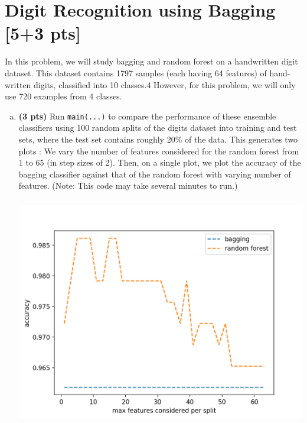 \documentclass[11pt]{article}
\begin{document}
\begin{enumerate}[(a)]
\begin{enumerate}[i.]
\end{enumerate}

\end{enumerate}

\section{Digit Recognition using Bagging [5+3 pts]}

In this problem, we will study bagging and random forest on a handwritten digit dataset. This dataset contains 1797 samples (each having 64 features) of hand-written digits, classified into 10 classes.4 However, for this problem, we will only use 720 examples from 4 classes.

\begin{enumerate}[(a)]
	\item \textbf{(3 pts)} Run \verb+main(...)+ to compare the performance of these ensemble classifiers using 100 random splits of the digits dataset into training and test sets, where the test set contains roughly 20\% of the data. This generates two plots : 
We vary the number of features considered for the random forest from 1 to 65 (in step sizes of 2). Then, on a single plot, we plot the accuracy of the bagging classifier against that of the random forest with varying number of features. (Note: This code may take several minutes to run.)

\begin{center}
\includegraphics[width = 15cm, height = 10cm]{bag_vs_rf.png}
\end{center}


\end{enumerate}
\end{document}
